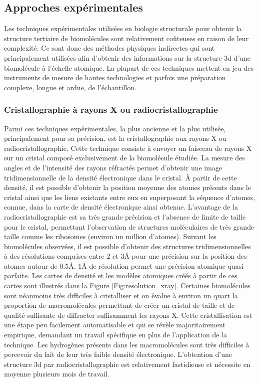 \subsection{Approches expérimentales}

Les techniques expérimentales utilisées en biologie structurale pour obtenir la structure tertiaire de biomolécules sont relativement coûteuses en raison de leur complexité. Ce sont donc des méthodes physiques indirectes qui sont principalement utilisées afin d'obtenir des informations sur la structure 3d d'une biomolécule à l'échelle atomique. La plupart de ces techniques mettent en jeu des instruments de mesure de hautes technologies et parfois une préparation complexe, longue et ardue, de l'échantillon.

\subsubsection{Cristallographie à rayons X ou radiocristallographie}

Parmi ces techniques expérimentales, la plus ancienne et la plus utilisée, principalement pour sa précision, est la cristallographie aux rayons X ou radiocristallographie. Cette technique consiste à envoyer un faisceau de rayons X sur un cristal composé exclusivement de la biomolécule étudiée. La mesure des angles et de l'intensité des rayons réfractés permet d'obtenir une image tridimensionnelle de la densité électronique dans le cristal. À partir de cette densité, il est possible d'obtenir la position moyenne des atomes présents dans le cristal ainsi que les liens existants entre eux en superposant la séquence d'atomes, connue, dans la carte de densité électronique ainsi obtenue. 
L'avantage de la radiocristallographie est sa très grande précision et l'absence de limite de taille pour le cristal, permettant l'observation de structures moléculaires de très grande taille comme les ribosomes (environ un million d'atomes). Suivant les biomolécules observées, il est possible d'obtenir des structures tridimensionnelles à des résolutions comprises entre 2 et 3\r{A} pour une précision sur la position des atomes autour de 0.5\r{A}. 1\r{A} de résolution permet une précision atomique quasi parfaite. Les cartes de densité et les modèles atomiques créés à partir de ces cartes sont illustrés dans la Figure \ref{Fig:resolution_xray}. 
Certaines biomolécules sont néanmoins très difficiles à cristalliser et on évalue à environ un quart la proportion de macromolécules permettant de créer un cristal de taille et de qualité suffisante de diffracter suffisamment les rayons X. Cette cristallisation est une étape peu facilement automatisable et qui se révèle majoritairement empirique, demandant un travail spécifique en plus de l'application de la technique. Les hydrogènes présents dans les macromolécules sont très difficiles à percevoir du fait de leur très faible densité électronique. L'obtention d'une structure 3d par radiocristallographie est relativement fastidieuse et nécessite en moyenne plusieurs mois de travail.

